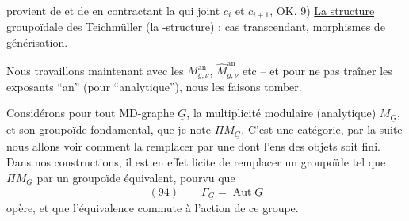 provient de
et de
en contractant la   qui joint $c_i$ et $c_{i+1}$, OK.
9) \uline{La structure groupoïdale des  Teichmüller } (la -structure) : cas transcendant, morphismes de générisation.

Nous travaillons maintenant avec les $M^{\mathrm{an}}_{g,\nu}$, $\widehat M^{\mathrm{an}}_{g,\nu}$ etc -- et pour ne pas traîner les exposants ``an'' (pour ``analytique''), nous les faisons tomber.

Considérons pour tout MD-graphe $\underline G$, la multiplicité modulaire (analytique) $M_{\underline G}$, et son groupoïde fondamental, que je note $\Pi M_{\underline G}$. C'est une  catégorie, par la suite nous allons voir comment la remplacer  par une   dont l'ens des objets soit fini. Dans nos constructions, il est en effet licite de remplacer un groupoïde tel que $\Pi M_{\underline G}$ par un groupoïde équivalent, pourvu que    
\[
(94)\qquad \Gamma_{\underline G}=\operatorname{Aut}\underline G
\]
opère, et que l'équivalence commute à l'action de ce groupe.

